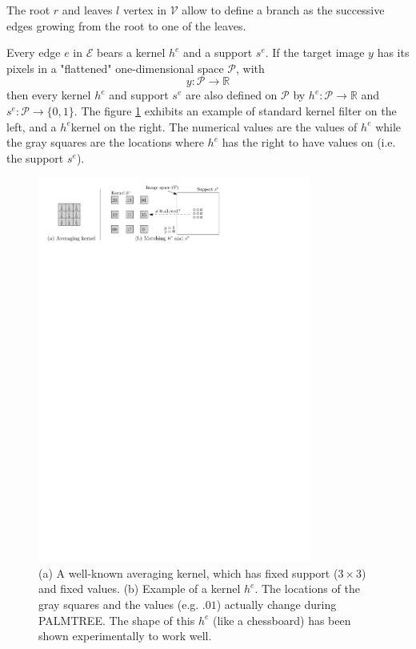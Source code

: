 The root $r$ and leaves $l$ vertex in $\mathcal{V}$ allow to define a branch as the successive edges growing from the root to one of the leaves.

Every edge $e$ in $\mathcal{E}$ bears a kernel $h^e$ and a support $s^e$. If the target image $y$ has its pixels in a "flattened" one-dimensional space $\mathcal{P}$, with
$$y : \mathcal{P} \rightarrow \mathbb{R}$$
then every kernel $h^e$ and support $s^e$ are also defined on $\mathcal{P}$ by $h^e:\mathcal{P} \rightarrow \mathbb{R}$ and $s^e:\mathcal{P} \rightarrow \{0,1\}$. The figure \ref{fig_example_kernel} exhibits an example of standard kernel filter on the left, and a $h^e$kernel on the right. The numerical values are the values of $h^e$ while the gray squares are the locations where $h^e$ has the right to have values on (i.e. the support $s^e$).

\begin{figure}[!ht]\centering
\includegraphics[width=0.8\textwidth]{figures/example-kernel.pdf}
\caption{(a) A well-known averaging kernel, which has fixed support ($3\times3$) and fixed values. (b) Example of a kernel $h^e$. The locations of the gray squares and the values (e.g. $.01$) actually change during PALMTREE. The shape of this $h^e$ (like a chessboard) has been shown experimentally to work well. \label{fig_example_kernel}}
\end{figure}

